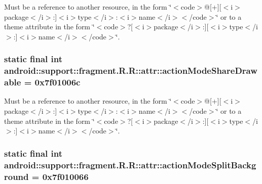 Must be a reference to another resource, in the form \char`\"{}$<$code$>$@\mbox{[}+\mbox{]}\mbox{[}$<$i$>$package$<$/i$>$:\mbox{]}$<$i$>$type$<$/i$>$:$<$i$>$name$<$/i$>$$<$/code$>$\char`\"{} or to a theme attribute in the form \char`\"{}$<$code$>$?\mbox{[}$<$i$>$package$<$/i$>$:\mbox{]}\mbox{[}$<$i$>$type$<$/i$>$:\mbox{]}$<$i$>$name$<$/i$>$$<$/code$>$\char`\"{}. \hypertarget{classandroid_1_1support_1_1fragment_1_1_r_1_1attr_bec924c8949e42009965612645a59809}{
\subsubsection[{actionModeShareDrawable}]{\setlength{\rightskip}{0pt plus 5cm}static final int android::support::fragment.R.R::attr::actionModeShareDrawable = 0x7f01006c}}
\label{classandroid_1_1support_1_1fragment_1_1_r_1_1attr_bec924c8949e42009965612645a59809}


Must be a reference to another resource, in the form \char`\"{}$<$code$>$@\mbox{[}+\mbox{]}\mbox{[}$<$i$>$package$<$/i$>$:\mbox{]}$<$i$>$type$<$/i$>$:$<$i$>$name$<$/i$>$$<$/code$>$\char`\"{} or to a theme attribute in the form \char`\"{}$<$code$>$?\mbox{[}$<$i$>$package$<$/i$>$:\mbox{]}\mbox{[}$<$i$>$type$<$/i$>$:\mbox{]}$<$i$>$name$<$/i$>$$<$/code$>$\char`\"{}. \hypertarget{classandroid_1_1support_1_1fragment_1_1_r_1_1attr_7351bdef2cc4635a897a5176f27cf634}{
\subsubsection[{actionModeSplitBackground}]{\setlength{\rightskip}{0pt plus 5cm}static final int android::support::fragment.R.R::attr::actionModeSplitBackground = 0x7f010066}}
\label{classandroid_1_1support_1_1fragment_1_1_r_1_1attr_7351bdef2cc4635a897a5176f27cf634}


